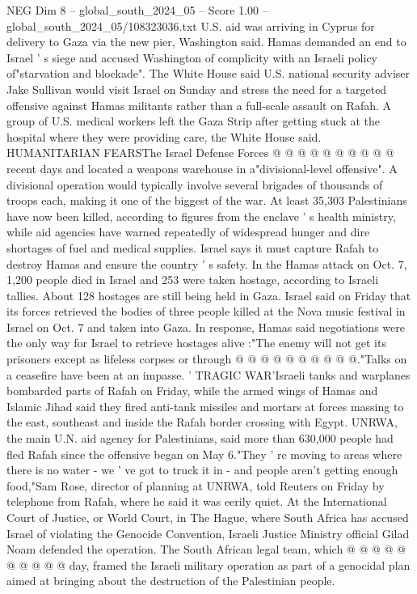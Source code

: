 \begin{textsample}{NEG Dim 8 – global\_south\_2024\_05 – Score 1.00 – global\_south\_2024\_05/108323036.txt}
U.S. aid was arriving in Cyprus for delivery to Gaza via the new pier, Washington said.
Hamas demanded an end to Israel ' s siege and accused Washington of complicity with an Israeli policy of"starvation and blockade".
The White House said U.S. national security adviser Jake Sullivan would visit Israel on Sunday and stress the need for a targeted offensive against Hamas militants rather than a full-scale assault on Rafah.
A group of U.S. medical workers left the Gaza Strip after getting stuck at the hospital where they were providing care, the White House said.
HUMANITARIAN FEARSThe Israel Defense Forces @ @ @ @ @ @ @ @ @ @ recent days and located a weapons warehouse in a"divisional-level offensive".
A divisional operation would typically involve several brigades of thousands of troops each, making it one of the biggest of the war.
At least 35,303 Palestinians have now been killed, according to figures from the enclave ' s health ministry, while aid agencies have warned repeatedly of widespread hunger and dire shortages of fuel and medical supplies.
Israel says it must capture Rafah to destroy Hamas and ensure the country ' s safety.
In the Hamas attack on Oct. 7, 1,200 people died in Israel and 253 were taken hostage, according to Israeli tallies.
About 128 hostages are still being held in Gaza.
Israel said on Friday that its forces retrieved the bodies of three people killed at the Nova music festival in Israel on Oct. 7 and taken into Gaza.
In response, Hamas said negotiations were the only way for Israel to retrieve hostages alive :"The enemy will not get its prisoners except as lifeless corpses or through @ @ @ @ @ @ @ @ @ @."Talks on a ceasefire have been at an impasse. ' TRAGIC WAR'Israeli tanks and warplanes bombarded parts of Rafah on Friday, while the armed wings of Hamas and Islamic Jihad said they fired anti-tank missiles and mortars at forces massing to the east, southeast and inside the Rafah border crossing with Egypt.
UNRWA, the main U.N. aid agency for Palestinians, said more than 630,000 people had fled Rafah since the offensive began on May 6."They ' re moving to areas where there is no water - we ' ve got to truck it in - and people aren't getting enough food,"Sam Rose, director of planning at UNRWA, told Reuters on Friday by telephone from Rafah, where he said it was eerily quiet.
At the International Court of Justice, or World Court, in The Hague, where South Africa has accused Israel of violating the Genocide Convention, Israeli Justice Ministry official Gilad Noam defended the operation.
The South African legal team, which @ @ @ @ @ @ @ @ @ @ day, framed the Israeli military operation as part of a genocidal plan aimed at bringing about the destruction of the Palestinian people.

\end{textsample}
